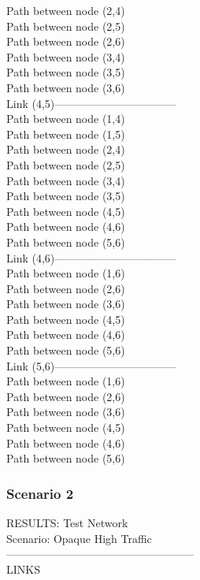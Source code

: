 Path between node (2,4)\\
Path between node (2,5)\\
Path between node (2,6)\\
Path between node (3,4)\\
Path between node (3,5)\\
Path between node (3,6)\\
Link (4,5)---------------------------------\\
Path between node (1,4)\\
Path between node (1,5)\\
Path between node (2,4)\\
Path between node (2,5)\\
Path between node (3,4)\\
Path between node (3,5)\\
Path between node (4,5)\\
Path between node (4,6)\\
Path between node (5,6)\\
Link (4,6)---------------------------------\\
Path between node (1,6)\\
Path between node (2,6)\\
Path between node (3,6)\\
Path between node (4,5)\\
Path between node (4,6)\\
Path between node (5,6)\\
Link (5,6)--------------------------------- \\
Path between node (1,6)\\
Path between node (2,6)\\
Path between node (3,6)\\
Path between node (4,5)\\
Path between node (4,6)\\
Path between node (5,6)\\


\subsubsection{Scenario 2}

\qquad RESULTS: Test Network \\

\quad Scenario: Opaque High Traffic \\

---------------------------------------------------\\
LINKS\\

